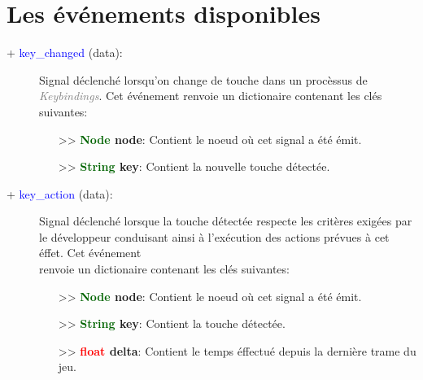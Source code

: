 \documentclass[a4paper, 11pt]{article}
\begin{document}
	\section{Les événements disponibles}
	\begin{description}
		\item [+ \textcolor{blue}{key\_changed} (data):] Signal déclenché lorsqu'on change de touche dans un 
		procèssus de \textcolor{gray}{\textit{\\Keybindings}}. Cet événement renvoie un dictionaire 
		contenant les clés suivantes:
		\begin{itemize}
			\item [>> \textbf{\textcolor{darkgreen}{Node} node}:] Contient le noeud où cet signal a été 
			émit.
			\item [>> \textbf{\textcolor{darkgreen}{String} key}:] Contient la nouvelle touche détectée.\\
		\end{itemize}
	\end{description}
	\begin{description}
		\item [+ \textcolor{blue}{key\_action} (data):] Signal déclenché lorsque la touche détectée respecte 
		les critères exigées par le développeur conduisant ainsi à l'exécution des actions prévues à cet 
		éffet. Cet événement \\renvoie un dictionaire contenant les clés suivantes:
		\begin{itemize}
			\item [>> \textbf{\textcolor{darkgreen}{Node} node}:] Contient le noeud où cet signal a été 
			émit.
			\item [>> \textbf{\textcolor{darkgreen}{String} key}:] Contient la touche détectée.
			\item [>> \textbf{\textcolor{red}{float} delta}:] Contient le temps éffectué depuis la dernière 
			trame du jeu.\\
		\end{itemize}
	\end{description}
\end{document}
